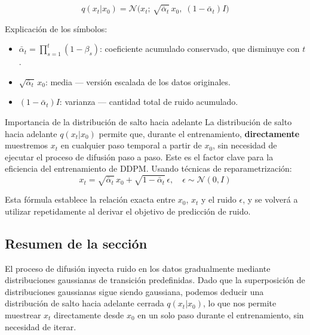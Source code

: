 $$q(x_t | x_0) = \mathcal{N}\big(x_t;\, \sqrt{\bar{\alpha}_t}\, x_0,\; (1 - \bar{\alpha}_t) I\big)$$

Explicación de los símbolos:
\begin{itemize}
    \item $\bar{\alpha}_t = \prod_{s=1}^{t}(1-\beta_s)$: coeficiente acumulado conservado, que disminuye con $t$.
    \item $\sqrt{\bar{\alpha}_t}\, x_0$: media — versión escalada de los datos originales.
    \item $(1 - \bar{\alpha}_t) I$: varianza — cantidad total de ruido acumulado.
\end{itemize}

\begin{importantbox}{Importancia de la distribución de salto hacia adelante}
La distribución de salto hacia adelante $q(x_t|x_0)$ permite que, durante el entrenamiento, \textbf{directamente} muestremos $x_t$ en cualquier paso temporal a partir de $x_0$, sin necesidad de ejecutar el proceso de difusión paso a paso. Este es el factor clave para la eficiencia del entrenamiento de DDPM. Usando técnicas de reparametrización:
$$x_t = \sqrt{\bar{\alpha}_t}\, x_0 + \sqrt{1 - \bar{\alpha}_t}\, \epsilon, \quad \epsilon \sim \mathcal{N}(0, I)$$
\end{importantbox}

Esta fórmula establece la relación exacta entre $x_0$, $x_t$ y el ruido $\epsilon$, y se volverá a utilizar repetidamente al derivar el objetivo de predicción de ruido.

\subsection{Resumen de la sección}

El proceso de difusión inyecta ruido en los datos gradualmente mediante distribuciones gaussianas de transición predefinidas. Dado que la superposición de distribuciones gaussianas sigue siendo gaussiana, podemos deducir una distribución de salto hacia adelante cerrada $q(x_t|x_0)$, lo que nos permite muestrear $x_t$ directamente desde $x_0$ en un solo paso durante el entrenamiento, sin necesidad de iterar.



